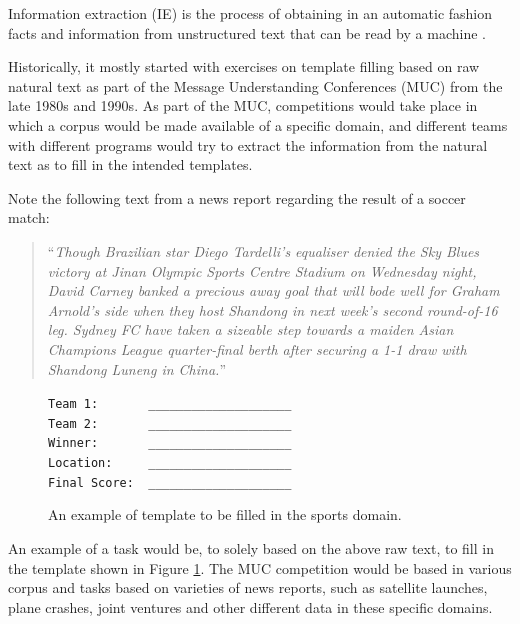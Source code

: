 \documentclass[11pt,a4paper,openright]{memoir}
\begin{document}
Information extraction (IE) is the process of obtaining in an automatic fashion facts and information from unstructured text that can be read by a machine \cite{Jurafsky:2000:SLP:555733}.

Historically, it mostly started with exercises on template filling based on raw natural text \cite{Moens:2006:IEA:1177314} as part of the Message Understanding Conferences (MUC) from the late 1980s and 1990s. As part of the MUC, competitions would take place in which a corpus would be made available of a specific domain, and different teams with different programs would try to extract the information from the natural text as to fill in the intended templates.

Note the following text from a news report regarding the result of a soccer match:

\blockquote{\enquote{\emph{Though Brazilian star Diego Tardelli's equaliser denied the Sky Blues victory at Jinan Olympic Sports Centre Stadium on Wednesday night, David Carney banked a precious away goal that will bode well for Graham Arnold's side when they host Shandong in next week's second round-of-16 leg. Sydney FC have taken a sizeable step towards a maiden Asian Champions League quarter-final berth after securing a 1-1 draw with Shandong Luneng in China.}}}

\begin{figure}[!htbp]
  \centering
  \RaggedRight
    \texttt{Team 1:\ \ \ \ \ \ \ \_\_\_\_\_\_\_\_\_\_\_\_\_\_\_\_\_\_\_\_} \\
    \texttt{Team 2:\ \ \ \ \ \ \ \_\_\_\_\_\_\_\_\_\_\_\_\_\_\_\_\_\_\_\_} \\
    \texttt{Winner:\ \ \ \ \ \ \ \_\_\_\_\_\_\_\_\_\_\_\_\_\_\_\_\_\_\_\_} \\
    \texttt{Location:\ \ \ \ \ \_\_\_\_\_\_\_\_\_\_\_\_\_\_\_\_\_\_\_\_} \\
    \texttt{Final Score:\ \ \_\_\_\_\_\_\_\_\_\_\_\_\_\_\_\_\_\_\_\_} \\
  \caption[An example of template to be filled in the sports domain.]{An example of template to be filled in the sports domain.}
  \label{fig:template_to_be_filled}
\end{figure}

An example of a task would be, to solely based on the above raw text, to fill in the template shown in Figure \ref{fig:template_to_be_filled}. The MUC competition would be based in various corpus and tasks based on varieties of news reports, such as satellite launches, plane crashes, joint ventures and other different data in these specific domains.
\end{document}
